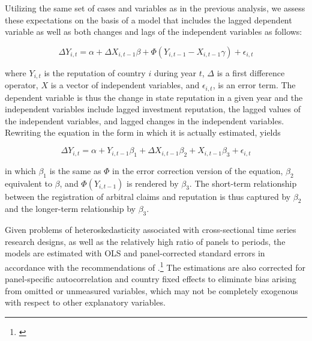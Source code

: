 \documentclass[12pt,onesided]{amsart}
\begin{document}
Utilizing the same set of cases and variables as in the previous analysis, we assess these expectations on the basis of a model that includes the lagged dependent variable as well as both changes and lags of the independent variables as follows:

\begin{equation}
\Delta Y_{i,t} = \alpha + \Delta X_{i,t-1} \beta + \Phi(Y_{i,t-1} - X_{i,t-1} \gamma) + \epsilon_{i,t}
\end{equation}

where $Y_{i,t}$ is the reputation of country $i$ during year $t$, $\Delta$ is a first difference operator, $X$ is a vector of independent variables, and $\epsilon_{i,t}$, is an error term. The dependent variable is thus the change in state reputation in a given year and the independent variables include lagged investment reputation, the lagged values of the independent variables, and lagged changes in the independent variables. Rewriting the equation in the form in which it is actually estimated, yields

\begin{equation}
\Delta Y_{i,t} = \alpha + Y_{i,t-1} \beta_{1} + \Delta X_{i,t-1} \beta_{2} + X_{i, t-1} \beta_{3} + \epsilon_{i,t}
\end{equation}

in which $\beta_{1}$ is the same as $\Phi$ in the error correction version of the equation, $\beta_{2}$ equivalent to $\beta$, and $\Phi(Y_{i,t-1})$ is rendered by $\beta_{3}$. The short-term relationship between the registration of arbitral claims and reputation is thus captured by $\beta_{2}$  and the longer-term relationship by $\beta_{3}$.

Given problems of heteroskedasticity associated with cross-sectional time series research designs, as well as the relatively high ratio of panels to periods, the models are estimated with OLS and panel-corrected standard errors in accordance with the recommendations of \citeauthor{beck:katz:1995}.\footnote{\citet{beck:katz:1995}} The estimations are also corrected for panel-specific autocorrelation and country fixed effects to eliminate bias arising from omitted or unmeasured variables, which may not be completely exogenous with respect to other explanatory variables.
\end{document}

